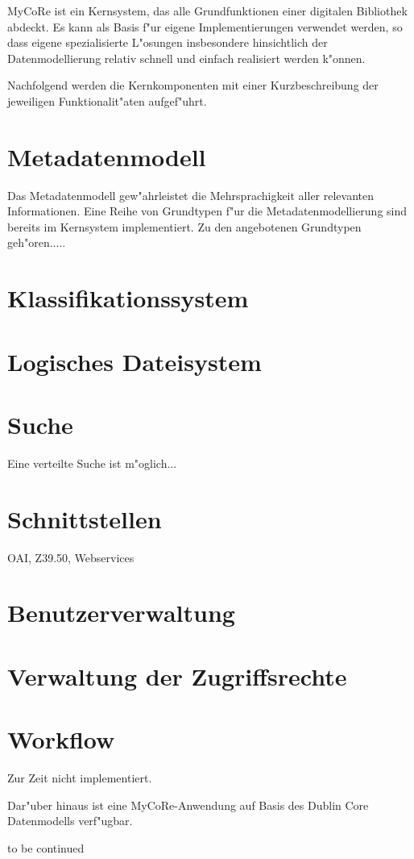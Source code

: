 %
MyCoRe ist ein Kernsystem, das alle Grundfunktionen einer digitalen Bibliothek abdeckt.
Es kann als Basis f"ur eigene Implementierungen verwendet werden, so dass
eigene spezialisierte L"osungen insbesondere hinsichtlich der Datenmodellierung
relativ schnell und einfach realisiert werden k"onnen.

Nachfolgend werden die Kernkomponenten mit einer Kurzbeschreibung der jeweiligen
Funktionalit"aten aufgef"uhrt.

\section{Metadatenmodell}
Das Metadatenmodell gew"ahrleistet die Mehrsprachigkeit aller relevanten Informationen.
Eine Reihe von Grundtypen f"ur die Metadatenmodellierung sind bereits im Kernsystem
implementiert.
Zu den angebotenen Grundtypen geh"oren.....

\section{Klassifikationssystem}
\section{Logisches Dateisystem}
\section{Suche}
Eine verteilte Suche ist m"oglich...

\section{Schnittstellen}
OAI, Z39.50, Webservices

\section{Benutzerverwaltung}
\section{Verwaltung der Zugriffsrechte}
\section{Workflow}
Zur Zeit nicht implementiert.


Dar"uber hinaus ist eine MyCoRe-Anwendung auf Basis des Dublin Core Datenmodells
verf"ugbar.


to be continued




 